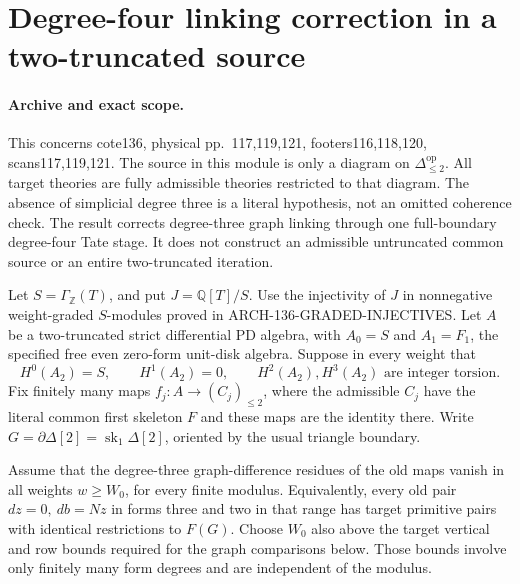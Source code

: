 \section{Degree-four linking correction in a two-truncated source}
\label{sec:136-two-truncated-linking-repair}

\paragraph{Archive and exact scope.}
This concerns cote136, physical pp.~117,119,121,
footers116,118,120, scans117,119,121.  The source in this
module is only a diagram on \(\Delta_{\leq2}^{\mathrm{op}}\).
All target theories are fully admissible theories restricted to
that diagram.  The absence of simplicial degree three is a
literal hypothesis, not an omitted coherence check.  The result
corrects degree-three graph linking through one full-boundary
degree-four Tate stage.  It does not construct an admissible
untruncated common source or an entire two-truncated iteration.

Let \(S=\Gamma_{\mathbb Z}(T)\), and put
\(J=\mathbb Q[T]/S\).  Use the injectivity of \(J\)
in nonnegative weight-graded \(S\)-modules proved in
ARCH-136-GRADED-INJECTIVES.  Let \(A\) be a two-truncated
strict differential PD algebra, with \(A_0=S\) and
\(A_1=F_1\), the specified free even zero-form unit-disk
algebra.  Suppose in every weight that
\[
 H^0(A_2)=S,\qquad H^1(A_2)=0,\qquad
              H^2(A_2),H^3(A_2)\text{ are integer torsion}.
                                                               \tag{136.TL1}
\]
Fix finitely many maps \(f_j:A\to(C_j)_{\leq2}\),
where the admissible \(C_j\) have the literal common first
skeleton \(F\) and these maps are the identity there.
Write \(G=\partial\Delta[2]=\operatorname{sk}_1\Delta[2]\),
oriented by the usual triangle boundary.

Assume that the degree-three graph-difference residues of the
old maps vanish in all weights \(w\geq W_0\), for every
finite modulus.  Equivalently, every old pair
\(dz=0,\ db=Nz\) in forms three and two in that range
has target primitive pairs with identical restrictions to
\(F(G)\).  Choose \(W_0\) also above the target vertical
and row bounds required for the graph comparisons below.
Those bounds involve only finitely many form degrees and are
independent of the modulus.

